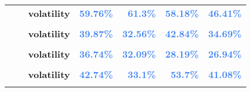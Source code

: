 \documentclass[
  authoryear,
  preprint,
  3p]{elsarticle}
\begin{document}
\begin{longtable}[t]{>{}l>{}l>{}l>{}r>{}r>{}r>{}r}
\addlinespace
\textbf{} & \textbf{} & \textbf{volatility} & \textcolor[HTML]{4285f4}{\textbf{59.76\%}} & \textcolor[HTML]{4285f4}{\textbf{61.3\%}} & \textcolor[HTML]{4285f4}{\textbf{58.18\%}} & \textcolor[HTML]{4285f4}{\textbf{46.41\%}}\\
\textbf{\cellcolor{gray!10}{Crude oil-WTI (XNYM)}} & \textbf{\cellcolor{gray!10}{whole period}} & \textbf{\cellcolor{gray!10}{mean}} & \textcolor[HTML]{4285f4}{\textbf{\cellcolor{gray!10}{15.43\%}}} & \textcolor[HTML]{4285f4}{\textbf{\cellcolor{gray!10}{*28.74\%}}} & \textcolor[HTML]{4285f4}{\textbf{\cellcolor{gray!10}{9.67\%}}} & \textcolor[HTML]{4285f4}{\textbf{\cellcolor{gray!10}{-5.64\%}}}\\
\textbf{} & \textbf{} & \textbf{volatility} & \textcolor[HTML]{4285f4}{\textbf{39.87\%}} & \textcolor[HTML]{4285f4}{\textbf{32.56\%}} & \textcolor[HTML]{4285f4}{\textbf{42.84\%}} & \textcolor[HTML]{4285f4}{\textbf{34.69\%}}\\
\textbf{\cellcolor{gray!10}{}} & \textbf{\cellcolor{gray!10}{backwardation}} & \textbf{\cellcolor{gray!10}{mean}} & \textcolor[HTML]{4285f4}{\textbf{\cellcolor{gray!10}{29.17\%}}} & \textcolor[HTML]{4285f4}{\textbf{\cellcolor{gray!10}{*35.61\%}}} & \textcolor[HTML]{4285f4}{\textbf{\cellcolor{gray!10}{11.47\%}}} & \textcolor[HTML]{4285f4}{\textbf{\cellcolor{gray!10}{14.24\%}}}\\
\textbf{} & \textbf{} & \textbf{volatility} & \textcolor[HTML]{4285f4}{\textbf{36.74\%}} & \textcolor[HTML]{4285f4}{\textbf{32.09\%}} & \textcolor[HTML]{4285f4}{\textbf{28.19\%}} & \textcolor[HTML]{4285f4}{\textbf{26.94\%}}\\
\addlinespace
\textbf{\cellcolor{gray!10}{}} & \textbf{\cellcolor{gray!10}{contango}} & \textbf{\cellcolor{gray!10}{mean}} & \textcolor[HTML]{4285f4}{\textbf{\cellcolor{gray!10}{2.21\%}}} & \textcolor[HTML]{4285f4}{\textbf{\cellcolor{gray!10}{22.04\%}}} & \textcolor[HTML]{4285f4}{\textbf{\cellcolor{gray!10}{9.95\%}}} & \textcolor[HTML]{4285f4}{\textbf{\cellcolor{gray!10}{-24.85\%}}}\\
\textbf{} & \textbf{} & \textbf{volatility} & \textcolor[HTML]{4285f4}{\textbf{42.74\%}} & \textcolor[HTML]{4285f4}{\textbf{33.1\%}} & \textcolor[HTML]{4285f4}{\textbf{53.7\%}} & \textcolor[HTML]{4285f4}{\textbf{41.08\%}}\\
\textbf{\cellcolor{gray!10}{Gasoline (XNYM)}} & \textbf{\cellcolor{gray!10}{whole period}} & \textbf{\cellcolor{gray!10}{mean}} & \textcolor[HTML]{4285f4}{\textbf{\cellcolor{gray!10}{16.65\%}}} & \textcolor[HTML]{4285f4}{\textbf{\cellcolor{gray!10}{30.95\%}}} & \textcolor[HTML]{4285f4}{\textbf{\cellcolor{gray!10}{10.59\%}}} & \textcolor[HTML]{4285f4}{\textbf{\cellcolor{gray!10}{-5.37\%}}}\\

\end{longtable}
\end{document}
